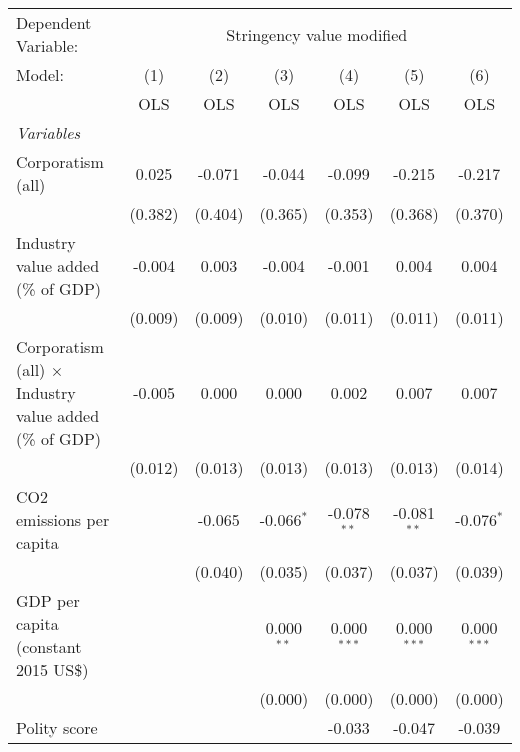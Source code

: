 
\begingroup
\centering
\begin{tabular}{lcccccc}
   \toprule
   Dependent Variable: & \multicolumn{6}{c}{Stringency value modified}\\
   Model:                                                        & (1)     & (2)     & (3)          & (4)           & (5)           & (6)\\  
                                                                 &  OLS    & OLS     & OLS          & OLS           & OLS           & OLS\\  
   \midrule
   \emph{Variables}\\
   Corporatism (all)                                             & 0.025   & -0.071  & -0.044       & -0.099        & -0.215        & -0.217\\   
                                                                 & (0.382) & (0.404) & (0.365)      & (0.353)       & (0.368)       & (0.370)\\   
   Industry value added (\% of GDP)                              & -0.004  & 0.003   & -0.004       & -0.001        & 0.004         & 0.004\\   
                                                                 & (0.009) & (0.009) & (0.010)      & (0.011)       & (0.011)       & (0.011)\\   
   Corporatism (all) $\times$ Industry value added (\% of GDP)   & -0.005  & 0.000   & 0.000        & 0.002         & 0.007         & 0.007\\   
                                                                 & (0.012) & (0.013) & (0.013)      & (0.013)       & (0.013)       & (0.014)\\   
   CO2 emissions per capita                                      &         & -0.065  & -0.066$^{*}$ & -0.078$^{**}$ & -0.081$^{**}$ & -0.076$^{*}$\\   
                                                                 &         & (0.040) & (0.035)      & (0.037)       & (0.037)       & (0.039)\\   
   GDP per capita (constant 2015 US\$)                           &         &         & 0.000$^{**}$ & 0.000$^{***}$ & 0.000$^{***}$ & 0.000$^{***}$\\   
                                                                 &         &         & (0.000)      & (0.000)       & (0.000)       & (0.000)\\   
   Polity score                                                  &         &         &              & -0.033        & -0.047        & -0.039\\   

\end{tabular}
